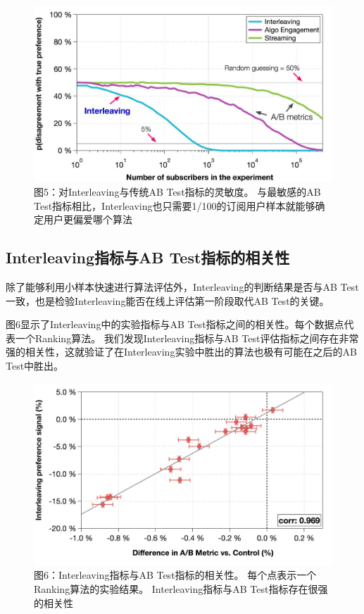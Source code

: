\documentclass[12pt]{article}
\begin{document}
\begin{figure}[H]
    \centering
    \includegraphics[width=1\textwidth]{fig/Netflix_Interleaving_Vs_AB_Test_Result.jpg}
    \caption*{图5：对Interleaving与传统AB Test指标的灵敏度。 与最敏感的AB Test指标相比，Interleaving也只需要1/100的订阅用户样本就能够确定用户更偏爱哪个算法}
\end{figure}

\subsection{Interleaving指标与AB Test指标的相关性}
除了能够利用小样本快速进行算法评估外，Interleaving的判断结果是否与AB Test一致，也是检验Interleaving能否在线上评估第一阶段取代AB Test的关键。

图6显示了Interleaving中的实验指标与AB Test指标之间的相关性。每个数据点代表一个Ranking算法。 我们发现Interleaving指标与AB Test评估指标之间存在非常强的相关性，这就验证了在Interleaving实验中胜出的算法也极有可能在之后的AB Test中胜出。
\begin{figure}[H]
    \centering
    \includegraphics[width=1\textwidth]{fig/Netflix_Interleaving_Vs_AB_Test_Relation.jpg}
    \caption*{图6：Interleaving指标与AB Test指标的相关性。 每个点表示一个Ranking算法的实验结果。 Interleaving指标与AB Test指标存在很强的相关性}
\end{figure}
\end{document}
